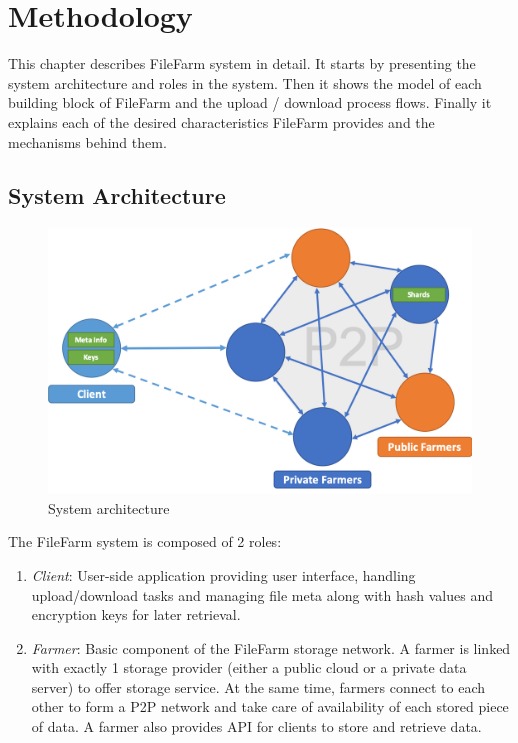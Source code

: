 \chapter{Methodology}
\label{c:methodology}

This chapter describes FileFarm system in detail. It starts by presenting the system architecture and roles in the system. Then it shows the model of each building block of FileFarm and the upload / download process flows. Finally it explains each of the desired characteristics FileFarm provides and the mechanisms behind them.

\section{System Architecture}
\label{s:systemarchitecture}

\begin{figure}[hbt]
\centering
  \includegraphics[width=15cm]{figures/system_architecture.png}
  \caption{System architecture}
  \label{fig:systemarchitecture}
\end{figure}

\noindent The FileFarm system is composed of 2 roles:

\begin{enumerate}
  \item \textit{Client}: User-side application providing user interface, handling upload/download tasks and managing file meta along with hash values and encryption keys for later retrieval.
  \item \textit{Farmer}: Basic component of the FileFarm storage network. A farmer is linked with exactly 1 storage provider (either a public cloud or a private data server) to offer storage service. At the same time, farmers connect to each other to form a P2P network and take care of availability of each stored piece of data. A farmer also provides API for clients to store and retrieve data.
\end{enumerate}

